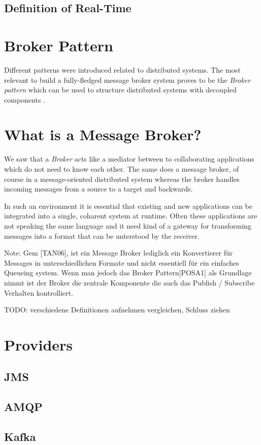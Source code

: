 \subsection{Definition of Real-Time}

\section{Broker Pattern}
Different patterns were introduced related to distributed systems. The most
relevant to build a fully-fledged message broker system proves to be the
\textit{Broker pattern} which can be used to structure distributed systems with
decoupled components \cite{POSA1}. 

\section{What is a Message Broker?}
We saw that a \textit{Broker} acts like a mediator between to collaborating
applications which do not need to know each other. The same does a message
broker, of course in a message-oriented distributed system whereas the broker
handles incoming messages from a source to a target and backwards. 

In such an environment it is essential that existing and new applications can be
integrated into a single, coharent system at runtime. Often these applications
are not speaking the same language and it need kind of a gateway for
transforming messages into a format that can be unterstood by the receiver.
\cite{TAN06}

Note: Gem [TAN06], ist ein Message Broker lediglich ein Konvertierer für
Messages in unterschiedlichen Formate und nicht essentiell für ein einfaches
Queueing system. Wenn man jedoch das Broker Pattern[POSA1] als Grundlage nimmt
ist der Broker die zentrale Komponente die auch das Publish / Subscribe
Verhalten kontrolliert. 

TODO: verschiedene Definitionen aufnehmen vergleichen, Schluss ziehen
\section{Providers}
\subsection{JMS}
\subsection{AMQP}
\subsection{Kafka}
\\
